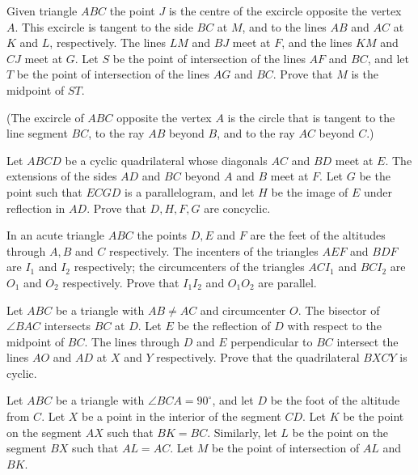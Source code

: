 \item[\textbf{G1.}]
Given triangle 
$ABC$
 the point 
$J$
 is the centre of the excircle opposite the vertex 
$A.$
 This excircle is tangent to the side 
$BC$
 at 
$M$, 
 and to the lines 
$AB$
 and 
$AC$
 at 
$K$
 and 
$L$, 
 respectively. The lines 
$LM$
 and 
$BJ$
 meet at 
$F$, 
 and the lines 
$KM$
 and 
$CJ$
 meet at 
$G.$
 Let 
$S$
 be the point of intersection of the lines 
$AF$
 and 
$BC$, 
 and let 
$T$
 be the point of intersection of the lines 
$AG$
 and 
$BC.$
 Prove that 
$M$
 is the midpoint of 
$ST.$


(The 
excircle
 of 
$ABC$
 opposite the vertex 
$A$
 is the circle that is tangent to the line segment 
$BC$, 
 to the ray 
$AB$
 beyond 
$B$, 
 and to the ray 
$AC$
 beyond 
$C$.)

\item[\textbf{G2.}]
Let 
$ABCD$
 be a cyclic quadrilateral whose diagonals 
$AC$
 and 
$BD$
 meet at 
$E$.
 The extensions of the sides 
$AD$
 and 
$BC$
 beyond 
$A$
 and 
$B$
 meet at 
$F$.
 Let 
$G$
 be the point such that 
$ECGD$
 is a parallelogram, and let 
$H$
 be the image of 
$E$
 under reflection in 
$AD$.
 Prove that 
$D,H,F,G$
 are concyclic.

\item[\textbf{G3.}]
In an acute triangle 
$ABC$
 the points 
$D,E$
 and 
$F$
 are the feet of the altitudes through 
$A,B$
 and 
$C$
 respectively. The incenters of the triangles 
$AEF$
 and 
$BDF$
 are 
$I_1$
 and 
$I_2$
 respectively; the circumcenters of the triangles 
$ACI_1$
 and 
$BCI_2$
 are 
$O_1$
 and 
$O_2$
 respectively. Prove that 
$I_1I_2$
 and 
$O_1O_2$
 are parallel.

\item[\textbf{G4.}]
Let 
$ABC$
 be a triangle with 
$AB \neq AC$
 and circumcenter 
$O$.
 The bisector of 
$\angle BAC$
 intersects 
$BC$
 at 
$D$.
 Let 
$E$
 be the reflection of 
$D$
 with respect to the midpoint of 
$BC$.
 The lines through 
$D$
 and 
$E$
 perpendicular to 
$BC$
 intersect the lines 
$AO$
 and 
$AD$
 at 
$X$
 and 
$Y$
 respectively. Prove that the quadrilateral 
$BXCY$
 is cyclic.

\item[\textbf{G5.}]
Let 
$ABC$
 be a triangle with 
$\angle BCA=90^{\circ}$, 
 and let 
$D$
 be the foot of the altitude from 
$C$.
 Let 
$X$
 be a point in the interior of the segment 
$CD$.
 Let 
$K$
 be the point on the segment 
$AX$
 such that 
$BK=BC$.
 Similarly, let 
$L$
 be the point on the segment 
$BX$
 such that 
$AL=AC$.
 Let 
$M$
 be the point of intersection of 
$AL$
 and 
$BK$.


